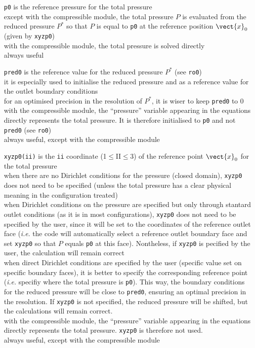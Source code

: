 {{\tt p0} is the reference pressure for the total
pressure\\
except with the compressible module, the total pressure $P$ is evaluated
from the reduced pressure $P^*$ so that $P$
is equal to {\tt p0} at the reference position $\vect{x}_0$ (given by {\tt xyzp0})\\
with the compressible module, the total pressure is solved directly\\
always useful}

{{\tt pred0} is the reference value for the reduced
pressure $P^*$ (see {\tt ro0})\\
it is especially used to initialise the reduced pressure and as a reference
value for the outlet boundary conditions\\
for an optimised precision in the resolution of $P^*$, it is wiser to keep {\tt pred0}
to 0\\
with the compressible module, the ``pressure'' variable appearing in the
equations directly represents the total pressure. It is therefore initialised
to {\tt p0} and not {\tt pred0} (see {\tt ro0})\\
always useful, except with the compressible module}

{{\tt xyzp0(ii)} is the {\tt ii} coordinate
(1$\leqslant$II$\leqslant$3) of the reference point $\vect{x}_0$ for the
total pressure\\
when there are no Dirichlet conditions for the pressure (closed domain), {\tt xyzp0}
does not need to be specified (unless the total pressure has a clear physical
meaning in the configuration treated)\\
when Dirichlet conditions on the pressure are specified but only through stantard
outlet conditions (as it is in most configurations),
{\tt xyzp0} does not need to be specified by the user, since it will be set to the
coordinates of the reference outlet face ({\em i.e.} the code will automatically
select a
reference outlet boundary face and set {\tt xyzp0} so that $P$ equals {\tt p0} at this
face). Nontheless, if {\tt xyzp0} is pecified by the user, the calculation will remain
correct\\
when direct Dirichlet conditions are specified by the user (specific value set
on specific boundary faces), it is better to specify the corresponding reference
point ({\em i.e.} specifiy where the total pressure is {\tt p0}). This way, the
boundary conditions for the reduced pressure will be close to {\tt pred0}, ensuring an
optimal precision in the resolution. If {\tt xyzp0} is not specified, the reduced
pressure will be shifted, but the calculations will remain correct.\\
with the compressible module, the ``pressure'' variable appearing in the
equations directly represents the total pressure. {\tt xyzp0} is therefore not used.\\
always useful, except with the compressible module}

